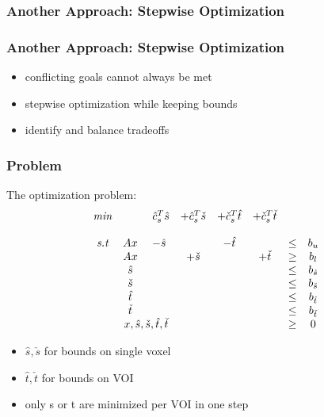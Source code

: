 \documentclass{beamer}
\begin{document}
\subsubsection*{Another Approach: Stepwise Optimization}
	\begin{frame}
	\frametitle{Another Approach: Stepwise Optimization}
	\begin{itemize}
	\item conflicting goals cannot always be met
	\item stepwise optimization while keeping bounds
	\item identify and balance tradeoffs
	\end{itemize}   
	\end{frame}
	
	\begin{frame}
		\frametitle{Problem}
		The optimization problem:		
		\begin{equation}
			\begin{matrix}
			\textit{min} &            & ~\hat{c}_s^T\hat{s} & +\hat{c}_s^T\check{s}    & +\check{c}_s^T\hat{t} & +\check{c}_s^T\check{t} & & \\\\
			\textit{s.t} & Ax         & -\hat{s}            &            & -\hat{t}  &            & \leq & b_u\\
			 		     & Ax         & 		            & +\check{s} &           & +\check{t} & \geq & b_l\\
					   	 & \hat{s}    & 		            &            &           &            & \leq & b_{\hat{s}}\\
			             & \check{s}  & 	                &            &           &            & \leq & b_{\check{s}}\\
			             & \hat{t}    & 		            &            &           &            & \leq & b_{\hat{t}}\\
			             & \check{t}  & 	                &            &           &            & \leq & b_{\check{t}}\\
						 & \multicolumn{2}{c}{x,\hat{s},\check{s},\hat{t},\check{t}} & & & & \geq & 0
			\end{matrix}	
		\end{equation}
		\begin{itemize}
			\item $\hat{s},\check{s}$ for bounds on single voxel
			\item $\hat{t},\check{t}$ for bounds on VOI
			\item only s or t are minimized per VOI in one step
		\end{itemize}   
	\end{frame}
	
\end{document}
